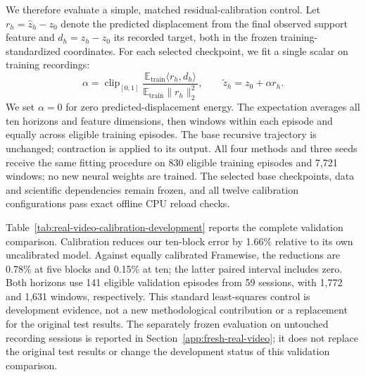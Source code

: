 We therefore evaluate a simple, matched residual-calibration control.
Let $r_h=\hat z_h-z_0$ denote the predicted displacement from the final
observed support feature and $d_h=z_h-z_0$ its recorded target, both in
the frozen training-standardized coordinates. For each selected checkpoint,
we fit a single scalar on training recordings:
\begin{equation}
 \alpha=\operatorname{clip}_{[0,1]}
 \frac{\mathbb{E}_{\mathrm{train}}\langle r_h,d_h\rangle}
      {\mathbb{E}_{\mathrm{train}}\|r_h\|_2^2},
 \qquad \tilde z_h=z_0+\alpha r_h .
 \label{eq:real-video-residual-calibration}
\end{equation}
We set $\alpha=0$ for zero predicted-displacement energy. The expectation
averages all ten horizons and feature dimensions, then windows within each
episode and equally across eligible training episodes. The base recursive
trajectory is unchanged; contraction is applied to its output.
All four methods and three seeds receive the same fitting procedure on
830 eligible training episodes and 7,721 windows; no new neural weights are
trained. The selected base checkpoints, data and scientific dependencies
remain frozen, and all twelve calibration configurations pass exact offline
CPU reload checks.

Table~\ref{tab:real-video-calibration-development} reports the complete
validation comparison. Calibration reduces our ten-block error by 1.66\%
relative to its own uncalibrated model. Against equally calibrated Framewise,
the reductions are 0.78\% at five blocks and 0.15\% at ten; the latter paired
interval includes zero. Both horizons use 141 eligible validation episodes
from 59 sessions, with 1,772 and 1,631 windows, respectively.
This standard least-squares control is development evidence, not a new
methodological contribution or a replacement for the original test results.
The separately frozen evaluation on untouched recording sessions is reported
in Section~\ref{app:fresh-real-video}; it does not replace the original test
results or change the development status of this validation comparison.


